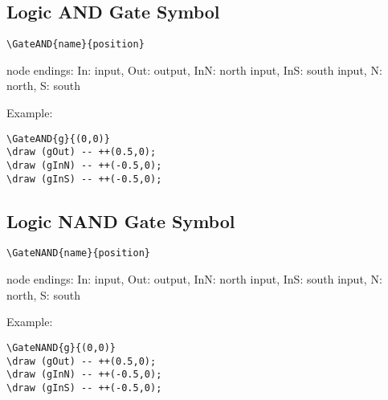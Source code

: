 \documentclass[parskip=full]{scrartcl}
\begin{document}
\subsection{Logic AND Gate Symbol}

\begin{verbatim}
\GateAND{name}{position}
\end{verbatim}
node endings: In: input, Out: output,
              InN: north input, InS: south input,
              N: north, S: south

Example:\\
\begin{minipage}{0.8\textwidth}
\begin{verbatim}
\GateAND{g}{(0,0)}
\draw (gOut) -- ++(0.5,0);
\draw (gInN) -- ++(-0.5,0);
\draw (gInS) -- ++(-0.5,0);
\end{verbatim}
\end{minipage}
\begin{minipage}{0.19\textwidth}
\end{minipage}

\subsection{Logic NAND Gate Symbol}

\begin{verbatim}
\GateNAND{name}{position}
\end{verbatim}
node endings: In: input, Out: output,
              InN: north input, InS: south input,
              N: north, S: south

Example:\\
\begin{minipage}{0.8\textwidth}
\begin{verbatim}
\GateNAND{g}{(0,0)}
\draw (gOut) -- ++(0.5,0);
\draw (gInN) -- ++(-0.5,0);
\draw (gInS) -- ++(-0.5,0);
\end{verbatim}
\end{minipage}
\begin{minipage}{0.19\textwidth}
\end{minipage}
\end{document}
